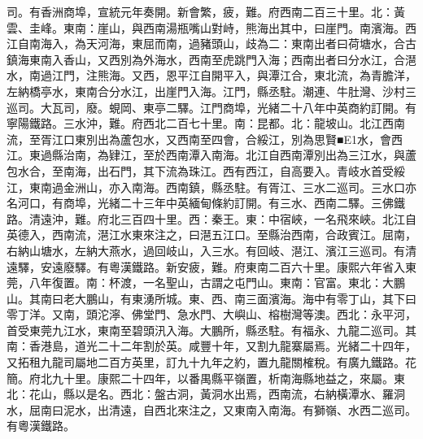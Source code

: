 \begin{pinyinscope}
司。有香洲商埠，宣統元年奏開。新會繁，疲，難。府西南二百三十里。北：黃雲、圭峰。東南：崖山，與西南湯瓶嘴山對峙，熊海出其中，曰崖門。南濱海。西江自南海入，為天河海，東屈而南，過豬頭山，歧為二：東南出者曰荷塘水，合古鎮海東南入香山，又西別為外海水，西南至虎跳門入海；西南出者曰分水江，合潖水，南過江門，注熊海。又西，恩平江自開平入，與潭江合，東北流，為青膽洋，左納橋亭水，東南合分水江，出崖門入海。江門，縣丞駐。潮連、牛肚灣、沙村三巡司。大瓦司，廢。蜆岡、東亭二驛。江門商埠，光緒二十八年中英商約訂開。有寧陽鐵路。三水沖，難。府西北二百七十里。南：昆都。北：龍坡山。北江西南流，至胥江口東別出為蘆包水，又西南至四會，合綏江，別為思賢■E1水，會西江。東過縣治南，為肄江，至於西南潭入南海。北江自西南潭別出為三江水，與蘆包水合，至南海，出石門，其下流為珠江。西有西江，自高要入。青岐水首受綏江，東南過金洲山，亦入南海。西南鎮，縣丞駐。有胥江、三水二巡司。三水口亦名河口，有商埠，光緒二十三年中英緬甸條約訂開。有三水、西南二驛。三佛鐵路。清遠沖，難。府北三百四十里。西：秦王。東：中宿峽，一名飛來峽。北江自英德入，西南流，潖江水東來注之，曰潖五江口。至縣治西南，合政賓江。屈南，右納山塘水，左納大燕水，過回岐山，入三水。有回岐、潖江、濱江三巡司。有清遠驛，安遠廢驛。有粵漢鐵路。新安疲，難。府東南二百六十里。康熙六年省入東莞，八年復置。南：杯渡，一名聖山，古謂之屯門山。東南：官富。東北：大鵬山。其南曰老大鵬山，有東湧所城。東、西、南三面濱海。海中有零丁山，其下曰零丁洋。又南，頭沱濘、佛堂門、急水門、大嶼山、榕樹灣等澳。西北：永平河，首受東莞九江水，東南至碧頭汛入海。大鵬所，縣丞駐。有福永、九龍二巡司。其南：香港島，道光二十二年割於英。咸豐十年，又割九龍寨屬焉。光緒二十四年，又拓租九龍司屬地二百方英里，訂九十九年之約，置九龍關榷稅。有廣九鐵路。花簡。府北九十里。康熙二十四年，以番禺縣平嶺置，析南海縣地益之，來屬。東北：花山，縣以是名。西北：盤古洞，黃洞水出焉，西南流，右納橫潭水、羅洞水，屈南曰泥水，出清遠，自西北來注之，又東南入南海。有獅嶺、水西二巡司。有粵漢鐵路。


\end{pinyinscope}
